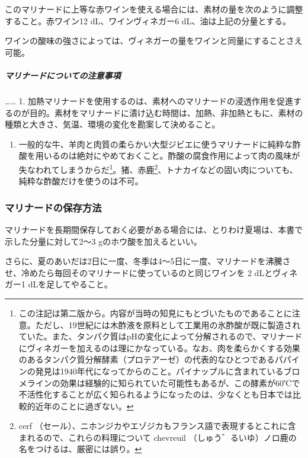\begin{recette}
\begin{itemize}
  このマリナードに上等な赤ワインを使える場合には、素材の量を次のように調整すること。赤ワイン12
  dL、ワインヴィネガー6 dL、油は上記の分量とする。

  ワインの酸味の強さによっては、ヴィネガーの量をワインと同量にすることさえ可能。
\end{itemize}

\hypertarget{observation-sur-les-marinades}{%
\subparagraph{マリナードについての注意事項}\label{observation-sur-les-marinades}}

\ldots{}\ldots{} 1.
加熱マリナードを使用するのは、素材へのマリナードの浸透作用を促進するのが目的。素材をマリナードに漬け込む時間は、加熱、非加熱ともに、素材の種類と大きさ、気温、環境の変化を勘案して決めること。

\begin{enumerate}
\def\labelenumi{\arabic{enumi}.}
\setcounter{enumi}{1}
\tightlist
\item
  一般的な牛、羊肉と肉質の柔らかい大型ジビエに使うマリナードに純粋な酢酸を用いるのは絶対にやめておくこと。酢酸の腐食作用によって肉の風味が失なわれてしまうからだ\footnote{この注記は第二版から。内容が当時の知見にもとづいたものであることに注意。ただし、19世紀には木酢液を原料として工業用の氷酢酸が既に製造されていた。また、タンパク質はpHの変化によって分解されるので、マリナードにヴィネガーを加えるのは理にかなっている。なお、肉を柔らかくする効果のあるタンパク質分解酵素（プロテアーゼ）の代表的なひとつであるパパインの発見は1940年代になってからのこと。パイナップルに含まれているブロメラインの効果は経験的に知られていた可能性もあるが、この酵素が60℃で不活性化することが広く知られるようになったのは、少なくとも日本では比較的近年のことに過ぎない。}。猪、赤鹿\footnote{cerf
    （セール）、ニホンジカやエゾジカもフランス語で表現するとこれに含まれるので、これらの料理について
    chevreuil （しゅう゛るいゆ）ノロ鹿の名をつけるは、厳密には誤り。}、トナカイなどの固い肉についても、純粋な酢酸だけを使うのは不可。
\end{enumerate}

\atoaki{}

\hypertarget{conservation-des-marinades}{%
\subsubsection{マリナードの保存方法}\label{conservation-des-marinades}}



マリナードを長期間保存しておく必要がある場合には、とりわけ夏場は、本書で示した分量に対して2〜3
gのホウ酸を加えるといい。

さらに、夏のあいだは2日に一度、冬季は4〜5日に一度、マリナードを沸騰させ、冷めたら毎回そのマリナードに使っているのと同じワインを
2 dLとヴィネガー1 dLを足してやること。
\end{recette}
